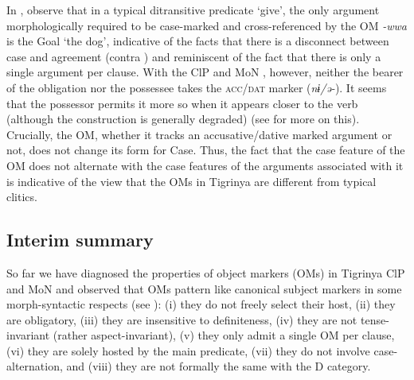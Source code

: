 \documentclass[output=paper]{langscibook}
\begin{document}
\noindent In , observe that in a typical ditransitive predicate `give', the only argument morphologically required to be case-marked and cross-referenced by the OM \emph{-wwa} is the Goal `the dog', indicative of the facts that there is a disconnect between case and agreement (contra \citealt{chomsky2000}) and reminiscent of the fact that there is only a single argument per clause. 
With the ClP  and MoN , however, neither the bearer of the obligation nor the possessee takes the {\scshape acc/dat} marker (\emph{nɨ/ə-}). It seems that the possessor permits it more so when it appears closer to the verb (although the construction is generally degraded) (see  for more on this). Crucially, the OM, whether it tracks an accusative/dative marked argument or not, does not change its form for Case.
Thus, the fact that the case feature of the OM does not alternate with the case features of the arguments associated with it is indicative of the view that the OMs in Tigrinya are different from typical clitics. 


\subsection{Interim summary}
So far we have diagnosed the properties of object markers (OMs) in Tigrinya ClP and MoN and observed that OMs pattern like canonical subject markers in some morph-syntactic respects (see ): (i) they do not freely select their host, (ii) they are obligatory, (iii) they are insensitive to definiteness, (iv) they are not tense-invariant (rather aspect-invariant), (v) they only admit a single OM per clause, (vi) they are solely hosted by the main predicate, (vii) they do not involve case-alternation, and (viii) they are not formally the same with the D category.
\end{document}
